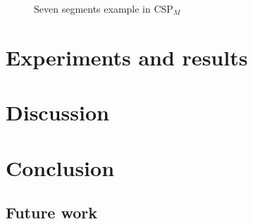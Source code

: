 \documentclass[a4paper]{report}
\newcommand{\cspm}{CSP$_M$}
\begin{document}
\begin{figure}
\label{seven_segments_exaple.csp}
\caption{Seven segments example in \cspm}
\end{figure}



\chapter{Experiments and results}
\chapter{Discussion}

\chapter{Conclusion}
\section{Future work}

\newpage


\end{document}
